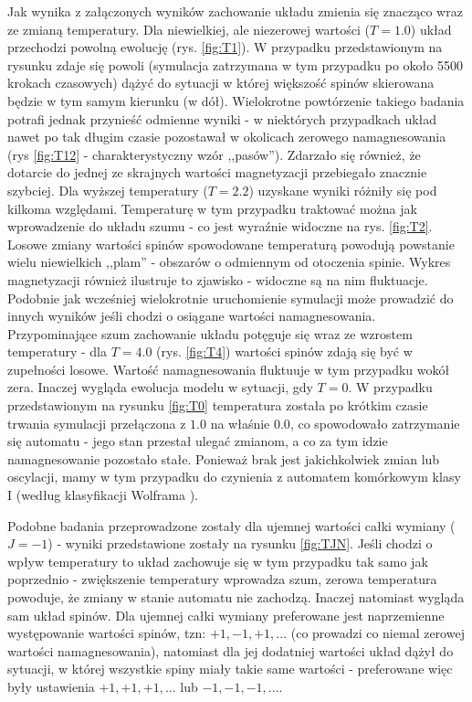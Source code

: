 \documentclass[11pt] {article}
\begin{document}
Jak wynika z załączonych wyników zachowanie układu zmienia się znacząco wraz ze zmianą temperatury. Dla niewielkiej, ale niezerowej wartości ($T = 1.0$) układ przechodzi powolną ewolucję (rys. \ref{fig:T1}). W przypadku przedstawionym na rysunku zdaje się powoli (symulacja zatrzymana w tym przypadku po około 5500 krokach czasowych) dążyć do sytuacji w której większość spinów skierowana będzie w tym samym kierunku (w dół). Wielokrotne powtórzenie takiego badania potrafi jednak przynieść odmienne wyniki - w niektórych przypadkach układ nawet po tak długim czasie pozostawał w okolicach zerowego namagnesowania (rys \ref{fig:T12} - charakterystyczny wzór ,,pasów''). Zdarzało się również, że dotarcie do jednej ze skrajnych wartości magnetyzacji przebiegało znacznie szybciej. Dla wyższej temperatury ($T = 2.2$) uzyskane wyniki różniły się pod kilkoma względami. Temperaturę w tym przypadku traktować można jak wprowadzenie do układu szumu - co jest wyraźnie widoczne na rys. \ref{fig:T2}. Losowe zmiany wartości spinów spowodowane temperaturą powodują powstanie wielu niewielkich ,,plam'' - obszarów o odmiennym od otoczenia spinie. Wykres magnetyzacji również ilustruje to zjawisko - widoczne są na nim fluktuacje. Podobnie jak wcześniej wielokrotnie uruchomienie symulacji może prowadzić do innych wyników jeśli chodzi o osiągane wartości namagnesowania. Przypominające szum zachowanie układu potęguje się wraz ze wzrostem temperatury - dla $T = 4.0$ (rys. \ref{fig:T4}) wartości spinów zdają się być w zupełności losowe. Wartość namagnesowania fluktuuje w tym przypadku wokół zera. Inaczej wygląda ewolucja modelu w sytuacji, gdy $T = 0$. W przypadku przedstawionym na rysunku \ref{fig:T0} temperatura została po krótkim czasie trwania symulacji przełączona z $1.0$ na właśnie $0.0$, co spowodowało zatrzymanie się automatu - jego stan przestał ulegać zmianom, a co za tym idzie namagnesowanie pozostało stałe. Ponieważ brak jest jakichkolwiek zmian lub oscylacji, mamy w tym przypadku do czynienia z automatem komórkowym klasy I (według klasyfikacji Wolframa \cite{malarz, kulakowski}).

\vspace{1.0em} 
Podobne badania przeprowadzone zostały dla ujemnej wartości całki wymiany ($J = -1$) - wyniki przedstawione zostały na rysunku \ref{fig:TJN}. Jeśli chodzi o wpływ temperatury to układ zachowuje się w tym przypadku tak samo jak poprzednio - zwiększenie temperatury wprowadza szum, zerowa temperatura powoduje, że zmiany w stanie automatu nie zachodzą. Inaczej natomiast wygląda sam układ spinów. Dla ujemnej całki wymiany preferowane jest naprzemienne występowanie wartości spinów, tzn: $+1, -1, +1, ...$ (co prowadzi co niemal zerowej wartości namagnesowania), natomiast dla jej dodatniej wartości układ dążył do sytuacji, w której wszystkie spiny miały takie same wartości - preferowane więc były ustawienia $+1, +1, +1, ...$ lub $-1, -1, -1, ...$.
\end{document}
